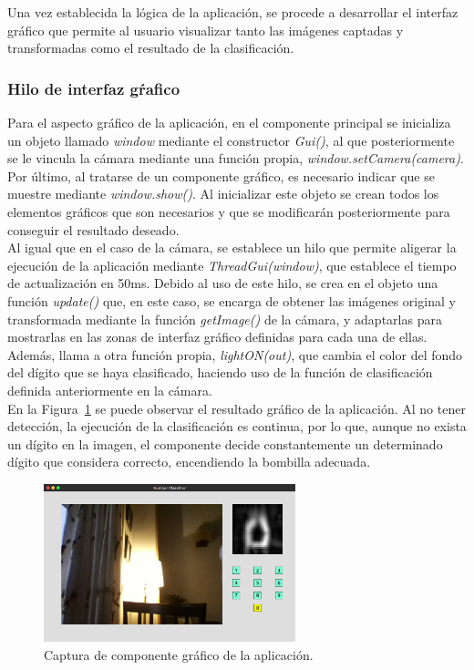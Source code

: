 Una vez establecida la lógica de la aplicación, se procede a desarrollar el interfaz gráfico que permite al usuario visualizar tanto las imágenes captadas y transformadas como el resultado de la clasificación.

\subsubsection{Hilo de interfaz gŕafico}
Para el aspecto gráfico de la aplicación, en el componente principal se inicializa un objeto llamado \textit{window} mediante el constructor \textit{Gui()}, al que posteriormente se le vincula la cámara mediante una función propia, \textit{window.setCamera(camera)}. Por último, al tratarse de un componente gráfico, es necesario indicar que se muestre mediante \textit{window.show()}. Al inicializar este objeto se crean todos los elementos gráficos que son necesarios y que se modificarán posteriormente para conseguir el resultado deseado.\\

Al igual que en el caso de la cámara, se establece un hilo que permite aligerar la ejecución de la aplicación mediante \textit{ThreadGui(window)}, que establece el tiempo de actualización en 50ms. Debido al uso de este hilo, se crea en el objeto una función \textit{update()} que, en este caso, se encarga de obtener las imágenes original y transformada mediante la función \textit{getImage()} de la cámara, y adaptarlas para mostrarlas en las zonas de interfaz gráfico definidas para cada una de ellas. Además, llama a otra función propia, \textit{lightON(out)}, que cambia el color del fondo del dígito que se haya clasificado, haciendo uso de la función de clasificación definida anteriormente en la cámara.\\

En la Figura~\ref{fig.gui} se puede observar el resultado gráfico de la aplicación. Al no tener detección, la ejecución de la clasificación es continua, por lo que, aunque no exista un dígito en la imagen, el componente decide constantemente un determinado dígito que considera correcto, encendiendo la bombilla adecuada.

\begin{figure}[H]
	\begin{center}
		\includegraphics[width=0.65\textwidth]{figures/gui}
		\caption{Captura de componente gráfico de la aplicación.}
		\label{fig.gui}
	\end{center}
\end{figure}

